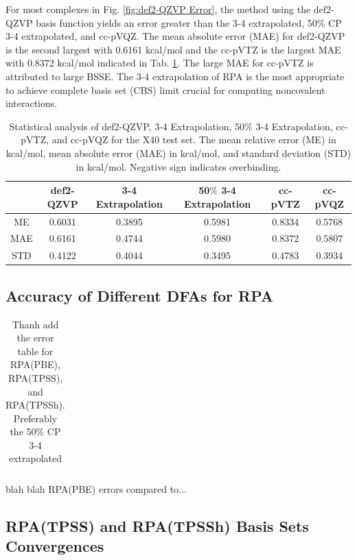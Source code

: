 \documentclass[11pt]{article}
\newcommand{\brian}[1]{{\color{orange} #1}}
\begin{document}
For most complexes in Fig. \ref{fig:def2-QZVP Error}, the method using
the def2-QZVP basis function yields an error greater than the 3-4 extrapolated,
50$\%$ CP 3-4 extrapolated, and cc-pVQZ. The mean absolute error (MAE) for
def2-QZVP is the second largest with 0.6161 kcal/mol and the cc-pVTZ is the
largest MAE with 0.8372 kcal/mol indicated in Tab. \ref{tab:table_1}. The
large MAE for cc-pVTZ is attributed to large BSSE. The 3-4 extrapolation
of RPA is the most appropriate to achieve complete basis set (CBS) limit
crucial for computing noncovalent interactions.

\begin{table}[hbpt]
  \caption{Statistical analysis of def2-QZVP, 3-4 Extrapolation, 50$\%$ 3-4
    Extrapolation, cc-pVTZ, and cc-pVQZ for the X40 test set. The mean
    relative error (ME) in kcal/mol, mean absolute error (MAE) in kcal/mol,
    and standard deviation (STD) in kcal/mol. Negative sign indicates overbinding.}
  \centering
  \begin{tabular}{c|c|c|c|c|c}
    & def2-QZVP & 3-4 Extrapolation & 50$\%$ 3-4 Extrapolation & cc-pVTZ  &
    cc-pVQZ \\
    \hline\hline
    ME & 0.6031 & 0.3895 & 0.5981 & 0.8334 & 0.5768 \\
    MAE & 0.6161 & 0.4744 & 0.5980 & 0.8372 & 0.5807 \\
    STD & 0.4122 & 0.4044 & 0.3495 & 0.4783 & 0.3934 \\
  \end{tabular}
  \label{tab:table_1}
\end{table}

\subsection{Accuracy of Different DFAs for RPA}

\begin{table}[hbpt]
  \centering
  \caption{\brian{Thanh add the error table for RPA(PBE), RPA(TPSS), and
      RPA(TPSSh). Preferably the 50$\%$ CP 3-4 extrapolated}}
  \begin{tabular}{c}
  \end{tabular}
  \label{tab:errors_RPA(DFA)}
\end{table}

\brian{blah blah RPA(PBE) errors compared to...}

\subsection{RPA(TPSS) and RPA(TPSSh) Basis Sets Convergences}
\end{document}
